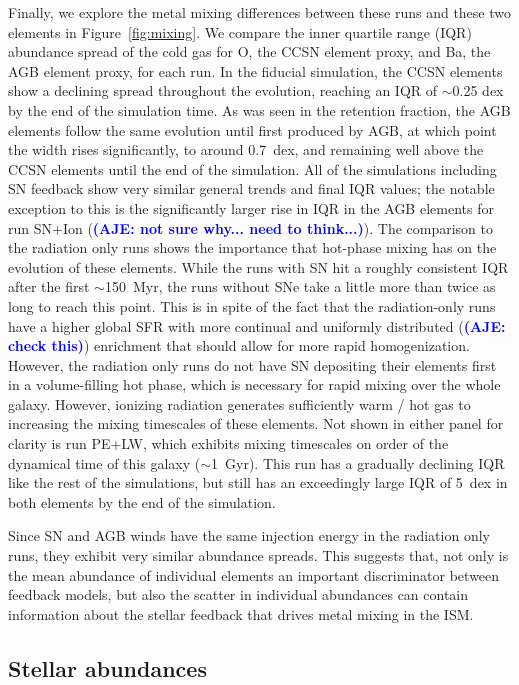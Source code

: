 \documentclass[twocolumn]{aastex62}
\newcommand{\aje}[1]{\textcolor{blue}{\textbf{(AJE: #1)}}}
\begin{document}
Finally, we explore the metal mixing differences between these runs and these two elements in Figure~\ref{fig:mixing}. We compare the inner quartile range (IQR) abundance spread of the cold gas for O, the CCSN element proxy, and Ba, the AGB element proxy, for each run. In the fiducial simulation, the CCSN elements show a declining spread throughout the evolution, reaching an IQR of $\sim$0.25 dex by the end of the simulation time. As was seen in the retention fraction, the AGB elements follow the same evolution until first produced by AGB, at which point the width rises significantly, to around 0.7~dex, and remaining well above the CCSN elements until the end of the simulation. All of the simulations including SN feedback show very similar general trends and final IQR values; the notable exception to this is the significantly larger rise in IQR in the AGB elements for run SN+Ion (\aje{not sure why... need to think...}). The comparison to the radiation only runs shows the importance that hot-phase mixing has on the evolution of these elements. While the runs with SN hit a roughly consistent IQR after the first $\sim$150~Myr, the runs without SNe take a little more than twice as long to reach this point. This is in spite of the fact that the radiation-only runs have a higher global SFR with more continual and uniformly distributed (\aje{check this}) enrichment that should allow for more rapid homogenization. However, the radiation only runs do not have SN depositing their elements first in a volume-filling hot phase, which is necessary for rapid mixing over the whole galaxy. However, ionizing radiation generates sufficiently warm / hot gas to increasing the mixing timescales of these elements. Not shown in either panel for clarity is run PE+LW, which exhibits mixing timescales on order of the dynamical time of this galaxy ($\sim$1~Gyr). This run has a gradually declining IQR like the rest of the simulations, but still has an exceedingly large IQR of 5~dex in both elements by the end of the simulation.

Since SN and AGB winds have the same injection energy in the radiation only runs, they exhibit very similar abundance spreads. This suggests that, not only is the mean abundance of individual elements an important discriminator between feedback models, but also the scatter in individual abundances can contain information about the stellar feedback that drives metal mixing in the ISM.


\subsection{Stellar abundances}
\label{sec:stellar abundances}
\end{document}

